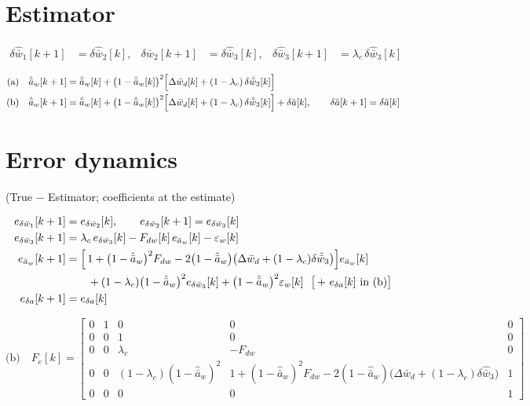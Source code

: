 \documentclass[11pt,a4paper,fontset=none]{ctexart}
\newcommand{\ba}{\bar{a}}
\newcommand{\bw}{\bar{w}}
\begin{document}
\section{Estimator}

\begin{align*}
\delta\hat{\bw}_1[k+1] &= \delta\hat{\bw}_2[k], &
\delta\hat{\bw}_2[k+1] &= \delta\hat{\bw}_3[k], &
\delta\hat{\bw}_3[k+1] &= \lambda_c\,\delta\hat{\bw}_3[k]
\end{align*}

\begin{align*}
\text{(a)}\quad \hat{\ba}_w[k+1] &= \hat{\ba}_w[k]
  + \bigl(1-\hat{\ba}_w[k]\bigr)^{2}
    \Bigl[\Delta\bw_d[k] + (1-\lambda_c)\,\delta\hat{\bw}_3[k]\Bigr] \\
\text{(b)}\quad \hat{\ba}_w[k+1] &= \hat{\ba}_w[k]
  + \bigl(1-\hat{\ba}_w[k]\bigr)^{2}
    \Bigl[\Delta\bw_d[k] + (1-\lambda_c)\,\delta\hat{\bw}_3[k]\Bigr]
  + \delta\hat{a}[k],
\qquad \delta\hat{a}[k+1] = \delta\hat{a}[k]
\end{align*}

\section{Error dynamics}

(True $-$ Estimator; coefficients at the estimate)

\begin{align*}
e_{\delta\bw_1}[k+1] &= e_{\delta\bw_2}[k], \qquad
e_{\delta\bw_2}[k+1] = e_{\delta\bw_3}[k] \\
e_{\delta\bw_3}[k+1] &= \lambda_c\,e_{\delta\bw_3}[k]
  - F_{dw}[k]\,e_{\ba_w}[k] - \varepsilon_w[k] \\
e_{\ba_w}[k+1] &= \Bigl[\,1 + \bigl(1-\hat{\ba}_w\bigr)^{2}F_{dw}
  - 2\bigl(1-\hat{\ba}_w\bigr)
    \bigl(\Delta\bw_d + (1-\lambda_c)\delta\hat{\bw}_3\bigr)\Bigr] e_{\ba_w}[k] \\
  &\qquad + (1-\lambda_c)\bigl(1-\hat{\ba}_w\bigr)^{2} e_{\delta\bw_3}[k]
  + \bigl(1-\hat{\ba}_w\bigr)^{2}\varepsilon_w[k]
  \ \ \bigl[\,+\ e_{\delta a}[k]\ \text{in (b)}\bigr] \\
e_{\delta a}[k+1] &= e_{\delta a}[k]
\end{align*}

\begin{equation*}
\text{(b)}\quad
F_e[k] =
\begin{bmatrix}
0 & 1 & 0 & 0 & 0 \\
0 & 0 & 1 & 0 & 0 \\
0 & 0 & \lambda_c & -F_{dw} & 0 \\
0 & 0 & (1-\lambda_c)(1-\hat{\ba}_w)^{2} &
  1 + (1-\hat{\ba}_w)^{2}F_{dw}
  - 2(1-\hat{\ba}_w)\bigl(\Delta\bw_d + (1-\lambda_c)\delta\hat{\bw}_3\bigr)
  & 1 \\
0 & 0 & 0 & 0 & 1
\end{bmatrix}
\end{equation*}
\end{document}
